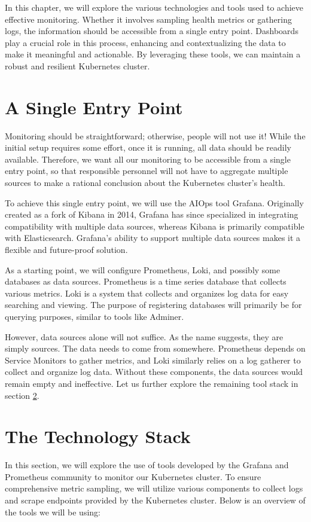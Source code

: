 In this chapter, we will explore the various technologies and tools used to achieve effective monitoring. Whether it involves sampling health metrics or gathering logs, the information should be accessible from a single entry point. Dashboards play a crucial role in this process, enhancing and contextualizing the data to make it meaningful and actionable. By leveraging these tools, we can maintain a robust and resilient Kubernetes cluster.

\section{A Single Entry Point}
Monitoring should be straightforward; otherwise, people will not use it! While the initial setup requires some effort, once it is running, all data should be readily available. Therefore, we want all our monitoring to be accessible from a single entry point, so that responsible personnel will not have to aggregate multiple sources to make a rational conclusion about the Kubernetes cluster’s health.

To achieve this single entry point, we will use the AIOps tool Grafana. Originally created as a fork of Kibana in 2014, Grafana has since specialized in integrating compatibility with multiple data sources, whereas Kibana is primarily compatible with Elasticsearch. Grafana's ability to support multiple data sources makes it a flexible and future-proof solution.

As a starting point, we will configure Prometheus, Loki, and possibly some databases as data sources. Prometheus is a time series database that collects various metrics. Loki is a system that collects and organizes log data for easy searching and viewing. The purpose of registering databases will primarily be for querying purposes, similar to tools like Adminer.

However, data sources alone will not suffice. As the name suggests, they are simply sources. The data needs to come from somewhere. Prometheus depends on Service Monitors to gather metrics, and Loki similarly relies on a log gatherer to collect and organize log data. Without these components, the data sources would remain empty and ineffective. Let us further explore the remaining tool stack in section \ref{sec:monitoring_stack}.

\section{The Technology Stack}\label{sec:monitoring_stack}
In this section, we will explore the use of tools developed by the Grafana and Prometheus community to monitor our Kubernetes cluster. To ensure comprehensive metric sampling, we will utilize various components to collect logs and scrape endpoints provided by the Kubernetes cluster. Below is an overview of the tools we will be using:

